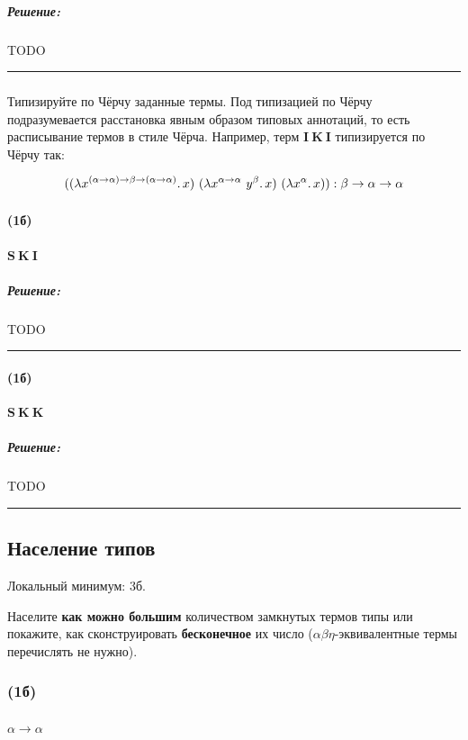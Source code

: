 \documentclass{article}
\newenvironment{proof}{\subparagraph{\hspace{-1em}Решение:\newline}}{\par\noindent\rule{\textwidth}{0.4pt}}
\newcommand{\term}[1]{\mathbf{#1}}
\newcommand{\ap}{~}
\begin{document}
    \begin{proof}
        TODO %
    \end{proof}

    \subsubsection{}

    Типизируйте по Чёрчу заданные термы.
    Под типизацией по Чёрчу подразумевается
    расстановка явным образом типовых аннотаций, то есть расписывание термов в стиле
    Чёрча.
    Например, терм $\term{I} \ap \term{K} \ap \term{I}$ типизируется по Чёрчу
    так:

    \[((\lambda x^{(\alpha \to \alpha) \to \beta \to (\alpha \to \alpha)}\ldotp x) \ap (\lambda x^{\alpha \to \alpha} \ap y^\beta\ldotp x) \ap (\lambda x^\alpha\ldotp x)):
    \beta \to \alpha \to \alpha\]

    \paragraph{(1б)} $\term{S} \ap \term{K} \ap \term{I}$

    \begin{proof}
        TODO %
    \end{proof}

    \paragraph{(1б)} $\term{S} \ap \term{K} \ap \term{K}$

    \begin{proof}
        TODO %
    \end{proof}

    \subsection{Население типов}

    Локальный минимум: 3б.

    Населите \textbf{как можно большим} количеством замкнутых термов типы или покажите, как
    сконструировать \textbf{бесконечное} их число ($\alpha\beta\eta$-эквивалентные
    термы перечислять не нужно).

    \subsubsection{(1б)}

    \paragraph{} $\alpha \to \alpha$
\end{document}
